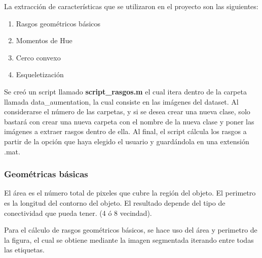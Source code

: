 \documentclass[a4paper, 11pt]{article}
\begin{document}
La extracción de características que se utilizaron en el proyecto son las siguientes:

\begin{enumerate}
\item Rasgos geométricos básicos
\item Momentos de Hue
\item Cerco convexo
\item Esqueletización
\end{enumerate}

Se creó un script llamado \textbf{script\_rasgos.m} el cual itera dentro de la carpeta llamada data\_aumentation, la cual consiste en las imágenes del dataset. Al considerarse el número de las carpetas, y si se desea crear una nueva clase, solo bastará con crear una nueva carpeta con el nombre de la nueva clase y poner las imágenes a extraer rasgos dentro de ella. Al final, el script cálcula los rasgos a partir de la opción que haya elegido el usuario y guardándola en una extensión .mat.

\subsubsection{Geométricas básicas}

El área es el número total de pixeles que cubre la región del objeto. El perimetro es la longitud del contorno del objeto. El resultado depende del tipo de conectividad que pueda tener. (4 ó 8 vecindad).

Para el cálculo de rasgos geométricos básicos, se hace uso del área y perimetro de la figura, el cual se obtiene mediante la imagen segmentada iterando entre todas las etiquetas.
\end{document}
